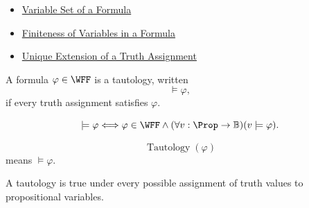 \begin{dependencies}
\begin{itemize}
  \item \hyperref[def:formula-variable-set-propositional-logic]{Variable Set of a Formula}
  \item \hyperref[lem:finiteness-of-variables-propositional-formulas]{Finiteness of Variables in a Formula}
  \item \hyperref[thm:unique-extension-truth-assignment-propositional-logic]{Unique Extension of a Truth Assignment}
\end{itemize}
\end{dependencies}
\begin{tcolorbox}[colback=propbox, colframe=propborder, arc=2pt,
  left=6pt, right=6pt, top=4pt, bottom=4pt,
  title={\small\textbf{Definition (Tautology)}},
  fonttitle=\small\bfseries]
\begin{definition}[Tautology]
\label{def:tautology-propositional-logic}
A formula \(\varphi\in\WFF\) is a tautology, written
\[
\models\varphi,
\]
if every truth assignment satisfies \(\varphi\).
\end{definition}
\end{tcolorbox}

\begin{remark*}
\[
\models\varphi
\Longleftrightarrow
\varphi\in\WFF
\land
(\forall v:\Prop\to\mathbb{B})(v\models\varphi).
\]
\end{remark*}

\begin{remark*}
\[
\operatorname{Tautology}(\varphi)
\]
means \(\models\varphi\).
\end{remark*}

\begin{remark*}[Interpretation]
A tautology is true under every possible assignment of truth values to propositional variables.
\end{remark*}

